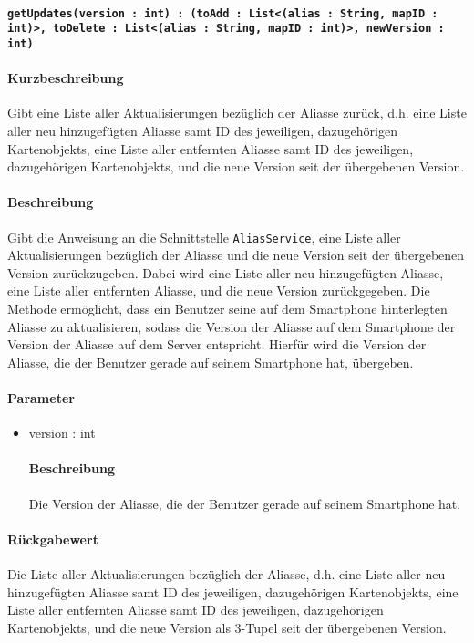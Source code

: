 \paragraph{\texttt{getUpdates(version : int) : (toAdd : List<(alias : String, mapID : int)>, toDelete : List<(alias : String, mapID : int)>, newVersion : int)}}%
\paragraph*{Kurzbeschreibung}
Gibt eine Liste aller Aktualisierungen bezüglich der Aliasse zurück, d.h. eine Liste aller neu hinzugefügten Aliasse samt ID des jeweiligen, dazugehörigen Kartenobjekts, eine Liste aller entfernten Aliasse samt ID des jeweiligen, dazugehörigen Kartenobjekts, und die neue Version seit der übergebenen Version.
\paragraph*{Beschreibung}
Gibt die Anweisung an die Schnittstelle \texttt{AliasService}, eine Liste aller Aktualisierungen bezüglich der Aliasse und die neue Version seit der übergebenen Version zurückzugeben. 
Dabei wird eine Liste aller neu hinzugefügten Aliasse, eine Liste aller entfernten Aliasse, und die neue Version zurückgegeben.
Die Methode ermöglicht, dass ein Benutzer seine auf dem Smartphone hinterlegten Aliasse zu aktualisieren, sodass die Version der Aliasse auf dem Smartphone der Version der Aliasse auf dem Server entspricht.
Hierfür wird die Version der Aliasse, die der Benutzer gerade auf seinem Smartphone hat, übergeben.
\paragraph*{Parameter}
\begin{itemize}
    \item version : int
    		\paragraph*{Beschreibung}
    		Die Version der Aliasse, die der Benutzer gerade auf seinem Smartphone hat.
\end{itemize}
\paragraph*{Rückgabewert}
Die Liste aller Aktualisierungen bezüglich der Aliasse, d.h. eine Liste aller neu hinzugefügten Aliasse samt ID des jeweiligen, dazugehörigen Kartenobjekts, eine Liste aller entfernten Aliasse samt ID des jeweiligen, dazugehörigen Kartenobjekts, und die neue Version als 3-Tupel seit der übergebenen Version.
